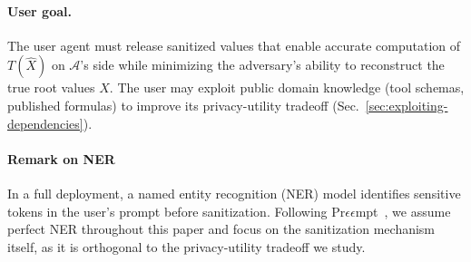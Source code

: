 \paragraph{User goal.} The user agent must release sanitized values that enable accurate computation of $T(\hat{X})$ on $\mathcal{A}$'s side while minimizing the adversary's ability to reconstruct the true root values $X$. The user may exploit public domain knowledge (tool schemas, published formulas) to improve its privacy-utility tradeoff (Sec.~\ref{sec:exploiting-dependencies}).
 
\paragraph{Remark on NER} In a full deployment, a named entity recognition (NER) model identifies sensitive tokens in the user's prompt before sanitization. Following Pr$\epsilon\epsilon$mpt~\cite{chowdhury2025}, we assume perfect NER throughout this paper and focus on the sanitization mechanism itself, as it is orthogonal to the privacy-utility tradeoff we study.